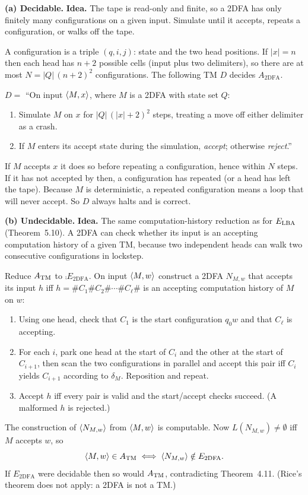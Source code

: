 \begin{soln}
\textbf{(a) Decidable.}
\textbf{Idea.} The tape is read-only and finite, so a 2DFA has only finitely many configurations on a given input. Simulate until it accepts, repeats a configuration, or walks off the tape.

A configuration is a triple $(q,i,j)$: state and the two head positions. If $|x|=n$ then each head has $n+2$ possible cells (input plus two delimiters), so there are at most $N=|Q|\,(n+2)^2$ configurations. The following TM $D$ decides $A_{\mathrm{2DFA}}$.

$D=$ ``On input $\langle M,x\rangle$, where $M$ is a 2DFA with state set $Q$:
\begin{enumerate}
\item Simulate $M$ on $x$ for $|Q|\,(|x|+2)^2$ steps, treating a move off either delimiter as a crash.
\item If $M$ enters its accept state during the simulation, \emph{accept}; otherwise \emph{reject}.''
\end{enumerate}

If $M$ accepts $x$ it does so before repeating a configuration, hence within $N$ steps. If it has not accepted by then, a configuration has repeated (or a head has left the tape). Because $M$ is deterministic, a repeated configuration means a loop that will never accept. So $D$ always halts and is correct.

\textbf{(b) Undecidable.}
\textbf{Idea.} The same computation-history reduction as for $E_{\mathrm{LBA}}$ (Theorem~5.10). A 2DFA can check whether its input is an accepting computation history of a given TM, because two independent heads can walk two consecutive configurations in lockstep.

Reduce $A_{\mathrm{TM}}$ to $\comp{E_{\mathrm{2DFA}}}$. On input $\langle M,w\rangle$ construct a 2DFA $N_{M,w}$ that accepts its input $h$ iff $h=\#C_1\#C_2\#\cdots\#C_\ell\#$ is an accepting computation history of $M$ on $w$:
\begin{enumerate}
\item Using one head, check that $C_1$ is the start configuration $q_0w$ and that $C_\ell$ is accepting.
\item For each $i$, park one head at the start of $C_i$ and the other at the start of $C_{i+1}$, then scan the two configurations in parallel and accept this pair iff $C_i$ yields $C_{i+1}$ according to $\delta_M$. Reposition and repeat.
\item Accept $h$ iff every pair is valid and the start/accept checks succeed. (A malformed $h$ is rejected.)
\end{enumerate}
The construction of $\langle N_{M,w}\rangle$ from $\langle M,w\rangle$ is computable. Now $L(N_{M,w})\neq\emptyset$ iff $M$ accepts $w$, so
\[
\langle M,w\rangle\in A_{\mathrm{TM}} \iff \langle N_{M,w}\rangle\notin E_{\mathrm{2DFA}}.
\]
If $E_{\mathrm{2DFA}}$ were decidable then so would $A_{\mathrm{TM}}$, contradicting Theorem~4.11. (Rice's theorem does not apply: a 2DFA is not a TM.)
\end{soln}

